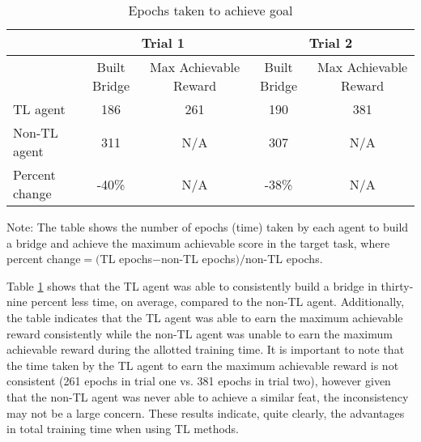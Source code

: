\documentclass{llncs}
\begin{document}
\renewcommand{\arraystretch}{1.2}
\begin{table}[htb]
  \begin{threeparttable}
    \caption{Epochs taken to achieve goal}\label{tab:1}
    \begin{tabular}{l|c|c|c|c} 
      \hline
      & \multicolumn{2}{|c|}{Trial 1} & \multicolumn{2}{|c}{Trial 2} \\
      \hline
                     & Built Bridge & \multicolumn{1}{p{2.5cm}|}{\centering Max Achievable Reward} & Built Bridge & \multicolumn{1}{p{2.5cm}}{\centering Max Achievable Reward} \\
      \hline
      TL agent       & 186          & 261                      & 190          & 381                      \\
      Non-TL agent   & 311          & N/A                      & 307          & N/A                      \\
      Percent change & -40\%        & N/A                      & -38\%        & N/A                      \\ 
      \hline
    \end{tabular}
    \begin{tablenotes}[flushleft]\footnotesize
    \item{Note: The table shows the number of epochs (time) taken by each agent to build a bridge and achieve the maximum achievable score in the target task, where percent change$=($TL epochs$-$non-TL epochs$)/$non-TL epochs.}
    \end{tablenotes}
  \end{threeparttable}
\end{table}

Table \ref{tab:1} shows that the TL agent was able to consistently build a bridge in thirty-nine percent less time, on average, compared to the non-TL agent. 
Additionally, the table indicates that the TL agent was able to earn the maximum achievable reward consistently while the non-TL agent was unable to earn the maximum achievable reward during the allotted training time. 
It is important to note that the time taken by the TL agent to earn the maximum achievable reward is not consistent (261 epochs in trial one vs. 381 epochs in trial two), however given that the non-TL agent was never able to achieve a similar feat, the inconsistency may not be a large concern. 
These results indicate, quite clearly, the advantages in total training time when using TL methods. 
\end{document}
